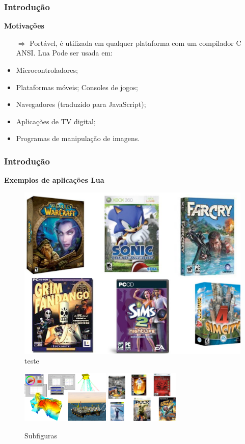﻿\documentclass{beamer}
\begin{document}
\begin{frame}[fragile]
\frametitle{Introdução}
{\bf Motivações}\vspace{0.4cm}
\begin{itemize}
\item[$\Rightarrow$] Portável, é utilizada em qualquer plataforma com um compilador C ANSI. Lua Pode ser usada em:
\pause
\item Microcontroladores;
\item Plataformas móveis;
Consoles de jogos;
\item Navegadores (traduzido para JavaScript);
\item Aplicações de TV digital;
\item Programas de manipulação de imagens.
\end{itemize}
\end{frame}

\begin{frame}[fragile]
\frametitle{Introdução}
{\bf Exemplos de aplicações Lua}\vspace{0.4cm}
\begin{figure}[!htb]
\centering
\includegraphics[width=0.4\linewidth]{imagens/exemplo2}
\caption{teste}
\end{figure}

\begin{figure}[!htb]
\centering
\includegraphics[height=2.5cm]{imagens/exemplo3}
\label{figdroopy}
\quad %
\includegraphics[height=2.5cm]{imagens/exemplo1}
\label{figsnoop}
\caption{Subfiguras}
\label{fig01}
\end{figure}
\end{frame}
\end{document}
